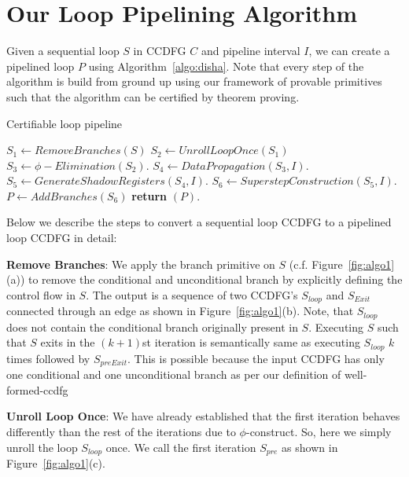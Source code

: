 \section{Our Loop Pipelining Algorithm}
Given a sequential loop $S$ in CCDFG $C$ and pipeline interval $I$, we can create a pipelined loop $P$ using Algorithm~\ref{algo:disha}. Note that every step of the algorithm is build from ground up using our framework of provable primitives such that the algorithm can be certified by theorem proving.

\begin{algorithm}[H]
\caption{Certifiable loop pipeline}
\label{algo:disha}
\State $S_1 \leftarrow RemoveBranches(S)$
\State $S_2 \leftarrow UnrollLoopOnce(S_1)$
\State $S_3 \leftarrow \phi-Elimination (S_2) $.
\State $S_4 \leftarrow DataPropagation (S_3, I) $.
\State $S_5 \leftarrow GenerateShadowRegisters (S_4, I) $.
\State $ S_6 \leftarrow SuperstepConstruction (S_5, I) $.
\State $P \leftarrow AddBranches (S_6) $
\State \textbf{return} $(P)$.
\EndProcedure
\end{algorithm}

Below we describe the steps to convert a sequential loop CCDFG to a pipelined loop CCDFG in detail:
 
{\bf Remove Branches}: We apply the branch primitive on $S$ (c.f. Figure~\ref{fig:algo1}(a)) to remove the conditional and unconditional branch by explicitly defining the control flow in $S$. The output is a sequence of two CCDFG's $S_{loop}$ and $S_{Exit}$ connected through an edge as shown in Figure~\ref{fig:algo1}(b).
Note, that $S_{loop}$ does not contain the conditional branch originally present in $S$.
Executing $S$ such that $S$ exits in the $(k+1)$st iteration is semantically same as executing $S_{loop}$ $k$ times
followed by $S_{preExit}$. This is possible because the input CCDFG has only one conditional and one unconditional branch as per our definition of well-formed-ccdfg 

{\bf Unroll Loop Once}: We have already established that the first iteration behaves differently than the rest of the
iterations due to $\phi$-construct. So, here we simply unroll the loop $S_{loop}$ once. We call the first iteration
$S_{pre}$ as shown in Figure~\ref{fig:algo1}(c).

